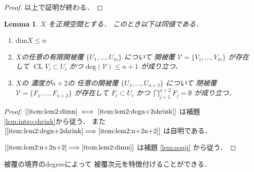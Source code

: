 \documentclass[leqno, a4paper, 12pt]{jsarticle}
\theoremstyle{plain}
\newtheorem{lem}[thm]{Lemma}
\theoremstyle{definition}
\theoremstyle{remark}
\newcommand{\To}{\Longrightarrow}
\DeclareMathOperator{\cl}{\mathrm{CL}}
\newcommand{\yodim}{\mathrm{dim}}
\newcommand{\yodeg}{\mathrm{deg}}
\newcommand{\yocovf}[1]{\mathscr{#1}}
\numberwithin{equation}{section}
\begin{document}
\begin{proof}
以上で証明が終わる．
\end{proof}

\begin{lem}\label{lem:hihukudim2}
$X$
を正規空間とする．
このとき以下は同値である．
\begin{enumerate}[label=\textup{(\arabic*)}]
\item\label{item:lem2:dimn} 
$\yodim X\le n$
\item\label{item:lem2:degn+2shrink} 

$X$の任意の有限開被覆
$\{U_{1}, \dots, U_{m}\}$
について
開被覆
$\yocovf{V}=\{V_{1}, \dots, V_{m}\}$
が存在して
$\cl V_{i}\subset U_{i}$
かつ
$\yodeg(\yocovf{V})\le n+1$
が成り立つ．


\item\label{item:lem2:n+2n+2} 
$X$の
濃度が$n+2$の
任意の開被覆
$\{U_{1}, \dots, U_{n+2}\}$
について
閉被覆
$\yocovf{V}=\{F_{1}, \dots, F_{n+2}\}$
が存在して
$F_{i}\subset U_{i}$
かつ
$\bigcap_{j=1}^{n+2}F_{j}=\emptyset$
が成り立つ．
\end{enumerate}
\end{lem}
\begin{proof}

$[\ref{item:lem2:dimn}\iff \ref{item:lem2:degn+2shrink}]$
は補題
\ref{lem:intro:shrink}から従う．
また
$[\ref{item:lem2:degn+2shrink}\To\ref{item:lem2:n+2n+2}]$
は自明である．

$[\ref{item:lem2:n+2n+2}\To \ref{item:lem2:dimn}]$
は補題
\ref{lem:souji}
から従う．
\end{proof}


被覆の境界のdegreeによって
被覆次元を特徴付けることができる．
\end{document}
